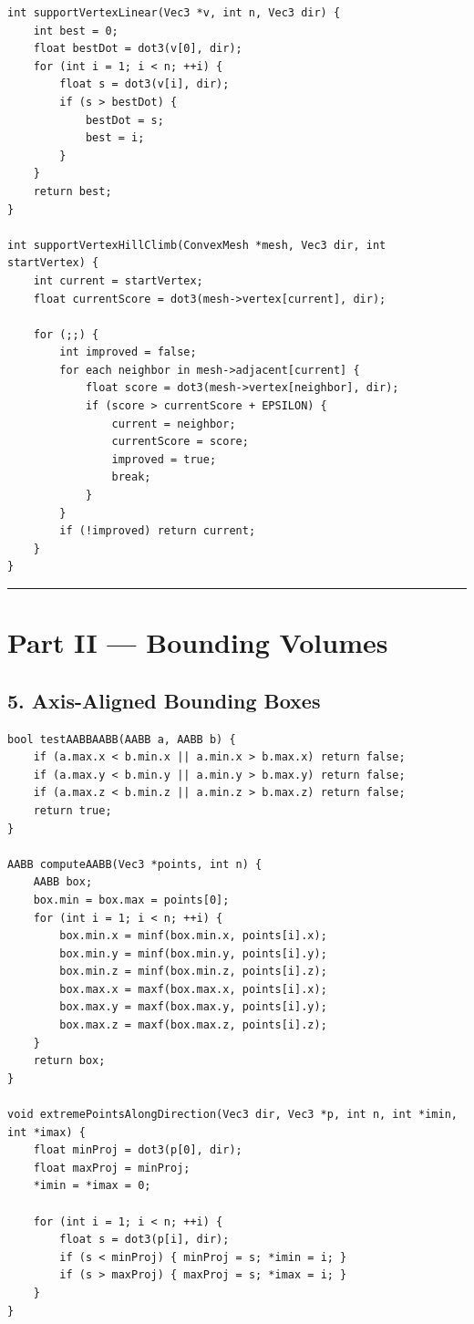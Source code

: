 \documentclass[10pt,letterpaper]{article}
\begin{document}
\begin{verbatim}
int supportVertexLinear(Vec3 *v, int n, Vec3 dir) {
    int best = 0;
    float bestDot = dot3(v[0], dir);
    for (int i = 1; i < n; ++i) {
        float s = dot3(v[i], dir);
        if (s > bestDot) {
            bestDot = s;
            best = i;
        }
    }
    return best;
}

int supportVertexHillClimb(ConvexMesh *mesh, Vec3 dir, int startVertex) {
    int current = startVertex;
    float currentScore = dot3(mesh->vertex[current], dir);

    for (;;) {
        int improved = false;
        for each neighbor in mesh->adjacent[current] {
            float score = dot3(mesh->vertex[neighbor], dir);
            if (score > currentScore + EPSILON) {
                current = neighbor;
                currentScore = score;
                improved = true;
                break;
            }
        }
        if (!improved) return current;
    }
}
\end{verbatim}

\medskip\hrule\medskip


\clearpage
{}
\section*{Part II --- Bounding Volumes}


\subsection*{5. Axis-Aligned Bounding Boxes}

\begin{verbatim}
bool testAABBAABB(AABB a, AABB b) {
    if (a.max.x < b.min.x || a.min.x > b.max.x) return false;
    if (a.max.y < b.min.y || a.min.y > b.max.y) return false;
    if (a.max.z < b.min.z || a.min.z > b.max.z) return false;
    return true;
}

AABB computeAABB(Vec3 *points, int n) {
    AABB box;
    box.min = box.max = points[0];
    for (int i = 1; i < n; ++i) {
        box.min.x = minf(box.min.x, points[i].x);
        box.min.y = minf(box.min.y, points[i].y);
        box.min.z = minf(box.min.z, points[i].z);
        box.max.x = maxf(box.max.x, points[i].x);
        box.max.y = maxf(box.max.y, points[i].y);
        box.max.z = maxf(box.max.z, points[i].z);
    }
    return box;
}

void extremePointsAlongDirection(Vec3 dir, Vec3 *p, int n, int *imin, int *imax) {
    float minProj = dot3(p[0], dir);
    float maxProj = minProj;
    *imin = *imax = 0;

    for (int i = 1; i < n; ++i) {
        float s = dot3(p[i], dir);
        if (s < minProj) { minProj = s; *imin = i; }
        if (s > maxProj) { maxProj = s; *imax = i; }
    }
}
\end{verbatim}
\end{document}

